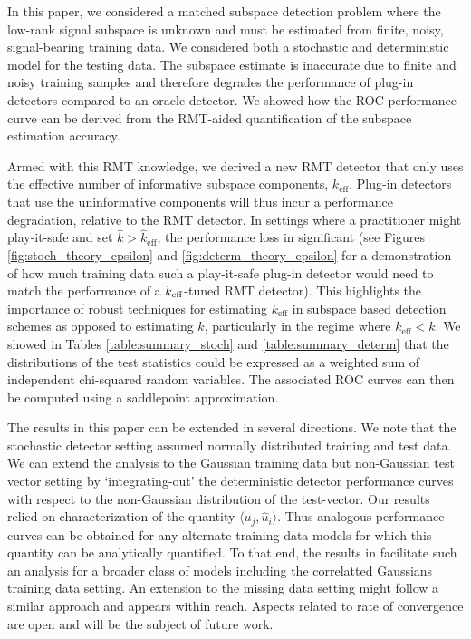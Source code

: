 In this paper, we considered a matched subspace detection problem where the low-rank signal subspace is unknown and must be estimated from finite, noisy, signal-bearing training data. We considered both a stochastic and deterministic model for the testing data. The subspace estimate is inaccurate due to finite and noisy training samples and therefore degrades the performance of plug-in detectors compared to an oracle detector. We showed how the ROC performance curve can be derived from the RMT-aided quantification of the subspace estimation accuracy.

Armed with this RMT knowledge, we derived a new RMT detector that only uses the effective number of informative subspace components, $k_\text{eff}$. Plug-in detectors that use the uninformative components will thus incur a performance degradation, relative to the RMT detector. In settings where a practitioner might play-it-safe and set $\widehat{k}> \widehat{k}_{\text{eff}}$, the performance loss in significant (see Figures \ref{fig:stoch_theory_epsilon} and \ref{fig:determ_theory_epsilon} for a demonstration of how much training data such a play-it-safe plug-in detector would need to match the performance of a $k_\text{eff}$-tuned RMT detector). This highlights the importance of robust techniques \cite{nadakuditi2010fundamental,johnstone2001distribution,el2007tracy} for estimating $k_\text{eff}$ in subspace based detection schemes as opposed to estimating $k$, particularly in the regime where $k_{\text{eff}} < k$.  We showed in Tables \ref{table:summary_stoch} and \ref{table:summary_determ} that the distributions of the test statistics could be expressed as a weighted sum of independent chi-squared random variables. The associated ROC curves can then be computed using a saddlepoint approximation.

The results in this paper can be extended in several directions. We note that the stochastic detector setting assumed normally distributed training and test data. We can extend the analysis to the Gaussian training data but non-Gaussian test vector setting by `integrating-out' the deterministic detector performance curves with respect to the non-Gaussian distribution of the test-vector. Our results relied on characterization of the quantity $\langle u_{j},\widehat{u}_{i}\rangle$.  Thus analogous performance curves can be obtained for any alternate training data models for which this quantity can be analytically quantified. To that end, the results in \cite{benaych2011singular} facilitate such an analysis for a broader class of models including the correlatted Gaussians training data setting. An extension to the missing data setting might follow a similar approach and appears within reach. Aspects related to rate of convergence are open and will be the subject of future work.